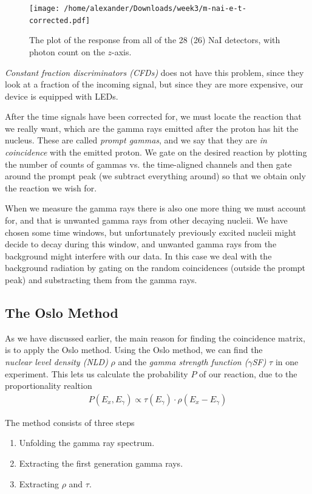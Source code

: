 \documentclass[a4paper,12pt]{article}
\newcommand{\eq}[1]{{\small\begin{align*}#1\end{align*}}}
\begin{document}
\begin{figure}[H]
    \centering
    \texttt{[image: /home/alexander/Downloads/week3/m-nai-e-t-corrected.pdf]}
    \caption{The plot of the response from all of the 28 (26) NaI detectors, with photon count on the $z$-axis.}
    \caption{}
    \label{fig:time-uncorrected}
\end{figure}

\textit{Constant fraction discriminators (CFDs)} does not have this
problem, since they look at a fraction of the incoming
signal, but since they are more expensive, our device
is equipped with LEDs.

After the time signals have been corrected for,
we must locate the reaction that we really want,
which are the gamma rays emitted after the proton has
hit the nucleus. These are called \textit{prompt gammas},
and we say that they are \textit{in coincidence} with the
emitted proton.
We gate on the desired reaction by plotting the number of
counts of gammas vs. the time-aligned channels and then
gate around the prompt peak (we subtract everything around)
so that we obtain only the reaction we wish for.

When we measure the gamma rays there is also one more thing we
must account for, and that is unwanted gamma rays from other 
decaying nucleii.
We have chosen some time windows, but unfortunately
previously excited nucleii might decide to decay during
this window, and unwanted gamma rays from the background 
might interfere with our data.
In this case we deal with the background radiation by
gating on the random coincidences (outside the prompt peak)
and substracting them from the gamma rays.

\subsection{The Oslo Method}
As we have discussed earlier, the main reason for finding the
coincidence matrix, is to apply the Oslo method.
Using the Oslo method, we can find the \\
\textit{nuclear level density (NLD)}
$\rho$ and the \textit{gamma strength function ($\gamma$SF)} 
$\tau$ in one experiment.
This lets us calculate the probability $P$ of our reaction,
due to the proportionality realtion
\eq{P(E_x,E_\gamma)\propto \tau(E_\gamma)\cdot\rho(E_x-E_\gamma)}

The method consists of three steps
\begin{enumerate}
    \item Unfolding the gamma ray spectrum.
    \item Extracting the first generation gamma rays.
    \item Extracting $\rho$ and $\tau$.
\end{enumerate}
\end{document}
